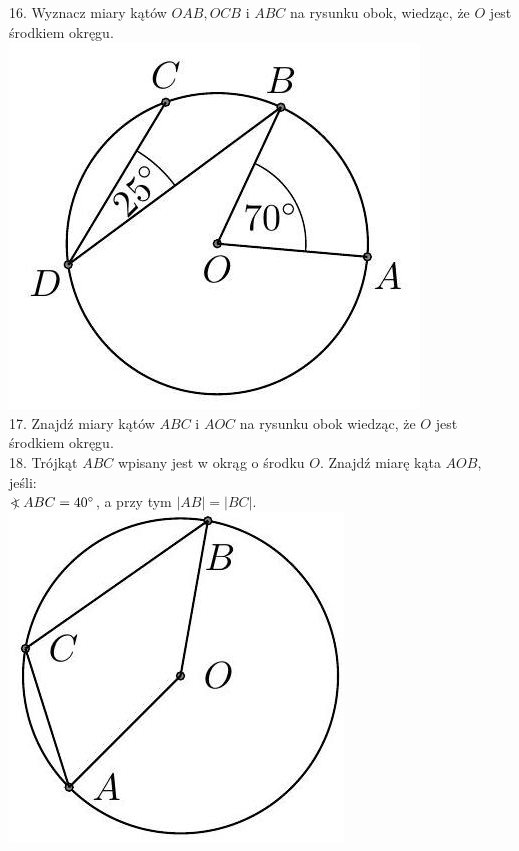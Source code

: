 \documentclass[10pt]{article}
\newcommand\Varangle{\mathop{{<\!\!\!\!\!\text{\small)}}\:}\nolimits}
\begin{document}
16. Wyznacz miary kątów \(O A B, O C B\) i \(A B C\) na rysunku obok, wiedząc, że \(O\) jest środkiem okręgu.\\
\includegraphics[max width=\textwidth, center]{2024_11_21_71f62bd117d375398909g-184}\\
17. Znajdź miary kątów \(A B C\) i \(A O C\) na rysunku obok wiedząc, że \(O\) jest środkiem okręgu.\\
18. Trójkąt \(A B C\) wpisany jest w okrąg o środku \(O\). Znajdź miarę kąta \(A O B\), jeśli:\\
\(\Varangle A B C=40^{\circ}\), a przy tym \(|A B|=|B C|\).\\
\includegraphics[max width=\textwidth, center]{2024_11_21_71f62bd117d375398909g-185(1)}\\
\end{document}
